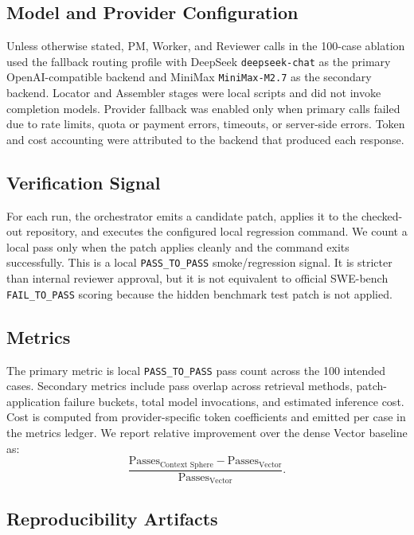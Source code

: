 \subsection{Model and Provider Configuration}

Unless otherwise stated, PM, Worker, and Reviewer calls in the 100-case ablation used the fallback routing profile with DeepSeek \texttt{deepseek-chat} as the primary OpenAI-compatible backend and MiniMax \texttt{MiniMax-M2.7} as the secondary backend. Locator and Assembler stages were local scripts and did not invoke completion models. Provider fallback was enabled only when primary calls failed due to rate limits, quota or payment errors, timeouts, or server-side errors. Token and cost accounting were attributed to the backend that produced each response.

\subsection{Verification Signal}

For each run, the orchestrator emits a candidate patch, applies it to the checked-out repository, and executes the configured local regression command. We count a local pass only when the patch applies cleanly and the command exits successfully. This is a local \texttt{PASS\_TO\_PASS} smoke/regression signal. It is stricter than internal reviewer approval, but it is not equivalent to official SWE-bench \texttt{FAIL\_TO\_PASS} scoring because the hidden benchmark test patch is not applied.

\subsection{Metrics}

The primary metric is local \texttt{PASS\_TO\_PASS} pass count across the 100 intended cases. Secondary metrics include pass overlap across retrieval methods, patch-application failure buckets, total model invocations, and estimated inference cost. Cost is computed from provider-specific token coefficients and emitted per case in the metrics ledger. We report relative improvement over the dense Vector baseline as:
\[
    \frac{\text{Passes}_{\text{Context Sphere}} - \text{Passes}_{\text{Vector}}}
    {\text{Passes}_{\text{Vector}}}.
\]

\subsection{Reproducibility Artifacts}


